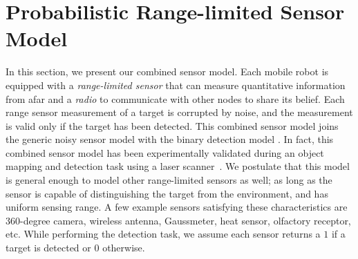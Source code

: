 \documentclass[letterpaper, 10 pt, conference]{ieeeconf}
\newcommand{\Ram}[1]{{\normalsize{\textbf{({\color{green}Ram:\ }#1)}}}}
\begin{document}
\section{Probabilistic Range-limited Sensor Model}
\label{sec:sec3}
In this section, we present our combined sensor model. Each mobile robot is equipped with a \emph{range-limited sensor} that can measure quantitative information from afar and a \emph{radio} to communicate with other nodes to share its belief. 
Each range sensor measurement of a target is corrupted by noise, and the measurement is valid only if the target has been detected.
This combined sensor model joins the generic noisy sensor model with the binary detection model \cite{viswanathan1997distributed,djuric2008target}.
In fact, this combined sensor model has been experimentally validated during an object mapping and detection task using a laser scanner~\cite{anguelov2004detecting}.
We postulate that this model is general enough to model other range-limited sensors as well; as long as the sensor is capable of distinguishing the target from the environment, and has uniform sensing range. 
A few example sensors satisfying these characteristics are 360-degree camera, wireless antenna, Gaussmeter, heat sensor, olfactory receptor, etc.
While performing the detection task, we assume each sensor returns a $1$ if a target is detected or $0$ otherwise. 
\end{document}
